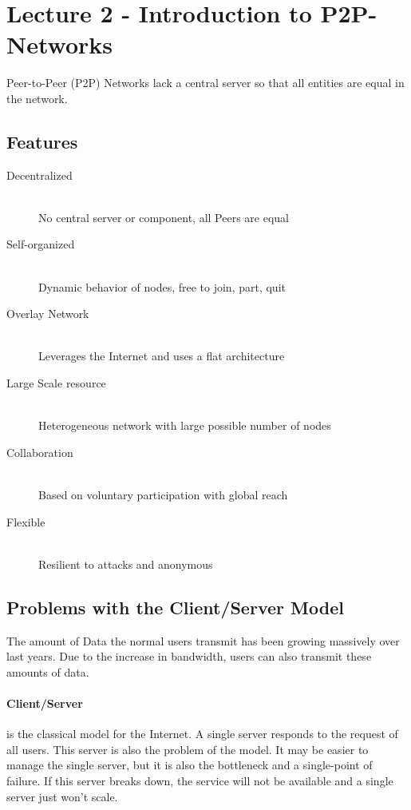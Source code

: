 \section{Lecture 2 - Introduction to P2P-Networks} %
\label{sec:lecture_2_introduction_to_p2p_networks}
Peer-to-Peer (P2P) Networks lack a central server so that all entities are equal in the network.

\subsection{Features} %
\label{sub:features}
\begin{description}
	\item[Decentralized] \hfill \\
		No central server or component, all Peers are equal
	\item[Self-organized] \hfill \\
		Dynamic behavior of nodes, free to join, part, quit
	\item[Overlay Network] \hfill \\
		Leverages the Internet and uses a flat architecture
	\item[Large Scale resource] \hfill \\
		Heterogeneous network with large possible number of nodes
	\item[Collaboration] \hfill \\
		Based on voluntary participation with global reach
	\item[Flexible] \hfill \\
		Resilient to attacks and anonymous
\end{description}

\subsection{Problems with the Client/Server Model} %
\label{sub:problems_with_the_client_server_model}
The amount of Data the normal users transmit has been growing massively over last years.
Due to the increase in bandwidth,
users can also transmit these amounts of data.

\paragraph{Client/Server} %
\label{par:client_server}
is the classical model for the Internet.
A single server responds to the request of all users.
This server is also the problem of the model.
It may be easier to manage the single server,
but it is also the bottleneck and a single-point of failure.
If this server breaks down,
the service will not be available
and a single server just won't scale.

